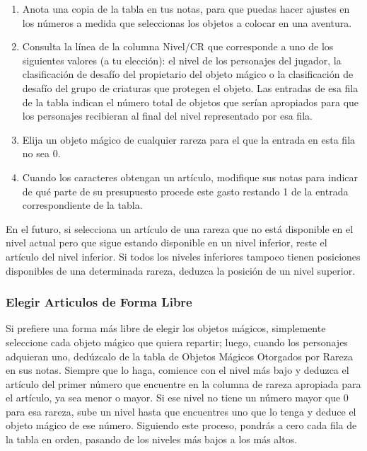 \documentclass[a4paper,twocolumn,openany,10pt]{dndbook}
\begin{document}
\begin{enumerate}
	\item Anota una copia de la tabla en tus notas, para que puedas hacer ajustes en los números a medida que seleccionas los objetos a colocar en una aventura.
	
	\item Consulta la línea de la columna Nivel/CR que corresponde a uno de los siguientes valores (a tu elección): el nivel de los personajes del jugador, la clasificación de desafío del propietario del objeto mágico o la clasificación de desafío del grupo de criaturas que protegen el objeto. Las entradas de esa fila de la tabla indican el número total de objetos que serían apropiados para que los personajes recibieran al final del nivel representado por esa fila.
	
	\item Elija un objeto mágico de cualquier rareza para el que la entrada en esta fila no sea 0.
	
	\item Cuando los caracteres obtengan un artículo, modifique sus notas para indicar de qué parte de su presupuesto procede este gasto restando 1 de la entrada correspondiente de la tabla.
\end{enumerate}
	
En el futuro, si selecciona un artículo de una rareza que no está disponible en el nivel actual pero que sigue estando
disponible en un nivel inferior, reste el artículo del nivel inferior. Si todos los niveles inferiores tampoco tienen posiciones
disponibles de una determinada rareza, deduzca la posición de un nivel superior. 

\subsubsection*{Elegir Articulos de Forma Libre}
Si prefiere una forma más libre de elegir los objetos mágicos, simplemente seleccione cada objeto mágico que quiera repartir;
luego, cuando los personajes adquieran uno, dedúzcalo de la tabla de Objetos Mágicos Otorgados por Rareza en sus notas. Siempre
que lo haga, comience con el nivel más bajo y deduzca el artículo del primer número que encuentre en la columna de rareza
apropiada para el artículo, ya sea menor o mayor. Si ese nivel no tiene un número mayor que 0 para esa rareza, sube un nivel
hasta que encuentres uno que lo tenga y deduce el objeto mágico de ese número. Siguiendo este proceso, pondrás a cero cada fila
de la tabla en orden, pasando de los niveles más bajos a los más altos. 
\end{document}
